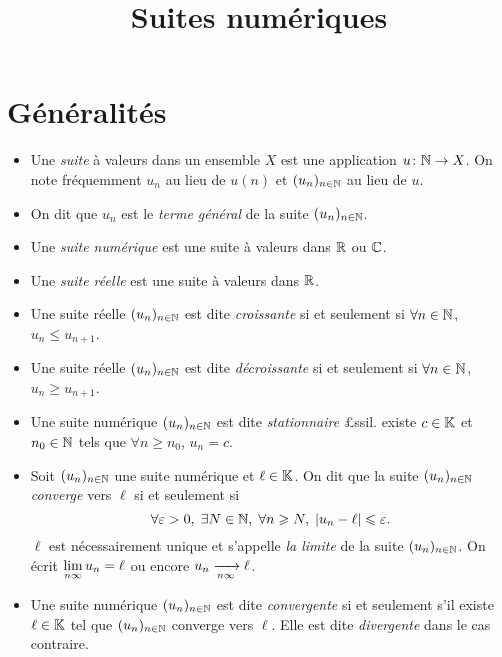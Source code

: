 \documentclass{yann}
\newcommand\U{(u_n)_{n\in\N}}
\begin{document}
\title{Suites numériques}
\maketitle

\section{Généralités}

\begin{itemize}
\item
Une \emph{suite} à valeurs dans un ensemble $X$ est une application $u\colon\mathbb{N}\to X$.
  On note fréquemment $u_n$ au lieu de $u(n)$ et $\U$ au lieu de $u$.
\item
On dit que $u_n$ est le \emph{terme général} de la suite $\U$.
\item
Une \emph{suite numérique} est une suite à valeurs dans $\mathbb{R}$ ou $\mathbb{C}$.
\item
Une \emph{suite réelle} est une suite à valeurs dans $\mathbb{R}$.
\item
Une suite réelle $\U$ est dite \emph{croissante} si et seulement si
  $\forall n\in\mathbb{N}$, $u_n\leq u_{n+1}$.
\item
Une suite réelle $\U$ est dite \emph{décroissante} si et seulement si
  $\forall n\in\mathbb{N}$, $u_n\geq u_{n+1}$.
\item
Une suite numérique $\U$ est dite \emph{stationnaire} £ssil. existe
  $c \in \mathbb{K}$ et $n_0 \in \mathbb{N}$ tels que $\forall n \geq n_0$, $u_n = c$.
\end{itemize}

\begin{itemize}
\item
Soit $\U$ une suite numérique et $\ell\in\mathbb{K}$.
  On dit que la suite $\U$ \emph{converge} vers $\ell$ si et seulement si
  \[ \forall\varepsilon> 0 ,\;\exists N\in\mathbb{N},\;\forall n\geqslant N,\;
  \left|{u_n -\ell}\right|\leqslant\varepsilon. \]
  $\ell$ est nécessairement unique et s'appelle \emph{la limite} de la suite $\U$.
  On écrit $\lim\limits_{{n\infty}} u_n = \ell$ ou encore $u_n \xrightarrow[{n\infty}]{}\ell$.
\item
Une suite numérique $\U$ est dite \emph{convergente} si et seulement s'il
  existe $\ell\in\mathbb{K}$ tel que $\U$ converge vers $\ell$.
  Elle est dite \emph{divergente} dans le cas contraire.
\end{itemize}

\end{document}
